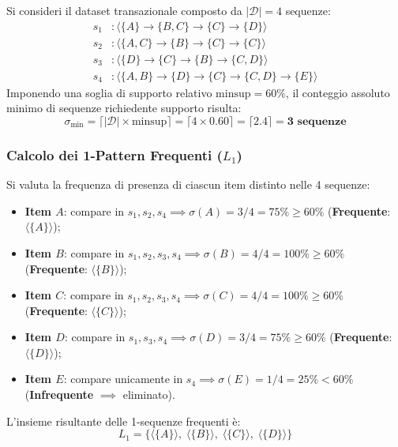 Si consideri il dataset transazionale composto da $|\mathcal{D}| = 4$ sequenze:
\begin{align}
s_1&: \langle \{A\} \to \{B, C\} \to \{C\} \to \{D\} \rangle \nonumber \\
s_2&: \langle \{A, C\} \to \{B\} \to \{C\} \to \{C\} \rangle \nonumber \\
s_3&: \langle \{D\} \to \{C\} \to \{B\} \to \{C, D\} \rangle \nonumber \\
s_4&: \langle \{A, B\} \to \{D\} \to \{C\} \to \{C, D\} \to \{E\} \rangle
\end{align}
Imponendo una soglia di supporto relativo $\text{minsup} = 60\%$, il conteggio assoluto minimo di sequenze richiedente supporto risulta:
\begin{equation}
\sigma_{\min} = \lceil |\mathcal{D}| \times \text{minsup} \rceil = \lceil 4 \times 0.60 \rceil = \lceil 2.4 \rceil = \mathbf{3 \text{ sequenze}}
\end{equation}

\FloatBarrier
\subsubsection{Calcolo dei 1-Pattern Frequenti ($L_1$)}
Si valuta la frequenza di presenza di ciascun item distinto nelle 4 sequenze:
\begin{itemize}
    \item \textbf{Item $A$}: compare in $s_1, s_2, s_4 \implies \sigma(A) = 3 / 4 = 75\% \ge 60\%$ (\textbf{Frequente}: $\langle \{A\} \rangle$);
    \item \textbf{Item $B$}: compare in $s_1, s_2, s_3, s_4 \implies \sigma(B) = 4 / 4 = 100\% \ge 60\%$ (\textbf{Frequente}: $\langle \{B\} \rangle$);
    \item \textbf{Item $C$}: compare in $s_1, s_2, s_3, s_4 \implies \sigma(C) = 4 / 4 = 100\% \ge 60\%$ (\textbf{Frequente}: $\langle \{C\} \rangle$);
    \item \textbf{Item $D$}: compare in $s_1, s_3, s_4 \implies \sigma(D) = 3 / 4 = 75\% \ge 60\%$ (\textbf{Frequente}: $\langle \{D\} \rangle$);
    \item \textbf{Item $E$}: compare unicamente in $s_4 \implies \sigma(E) = 1 / 4 = 25\% < 60\%$ (\textbf{Infrequente} $\implies$ eliminato).
\end{itemize}

L'insieme risultante delle 1-sequenze frequenti è:
\begin{equation}
L_1 = \big\{ \langle \{A\} \rangle, \; \langle \{B\} \rangle, \; \langle \{C\} \rangle, \; \langle \{D\} \rangle \big\}
\end{equation}

